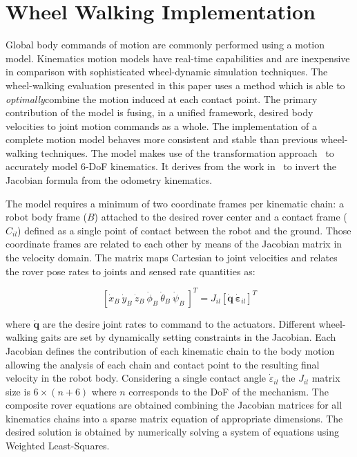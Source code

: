 \documentclass[a4paper,twocolumn]{esapub2005} %
\begin{document}
\section{Wheel Walking Implementation}

Global body commands of motion are commonly performed using a motion model.
Kinematics motion models have real-time capabilities and are inexpensive in
comparison with sophisticated wheel-dynamic simulation techniques.  The
wheel-walking evaluation presented in this paper uses a method which is able to
\textit{optimally}\footnotemark[2] combine the motion induced at each contact
point. The primary contribution of the model is fusing, in a unified framework,
desired body velocities to joint motion commands as a whole.  The
implementation of a complete motion model behaves more consistent and stable
than previous wheel-walking techniques. The model makes use of the
transformation approach~\cite{Tarokh2005} to accurately model 6-DoF kinematics.
It derives from the work in~\cite{Hidalgo-Carrio2014} to invert the Jacobian
formula from the odometry kinematics.

The model requires a minimum of two coordinate frames per kinematic chain:
a robot body frame ($B$) attached to the desired rover center and a
contact frame ($C_{il}$) defined as a single point of contact between the robot
and the ground. Those coordinate frames are related to each other by means of
the Jacobian matrix in the velocity domain. The matrix maps Cartesian to joint velocities and
relates the rover pose rates to joints and sensed rate quantities as:

\begin{equation}
    \left[\dot{x}_{B} ~ \dot{y}_{B} ~ \dot{z}_{B} ~ \dot{\phi}_{B} ~ \dot{\theta}_{B} ~ \dot{\psi}_{B} ~ \right]^T =
    J_{il} \left[\boldsymbol{\dot{q}} ~ \boldsymbol{\dot{\varepsilon}}_{il} \right]^T
\label{eq:wheeljacobian}
\end{equation}

where $\boldsymbol{\dot{q}}$ are the desire joint rates to command to the
actuators.  Different wheel-walking gaits are set by dynamically setting
constraints in the Jacobian. Each Jacobian defines the contribution of each
kinematic chain to the body motion allowing the analysis of each chain and
contact point to the resulting final velocity in the robot body.  Considering a
single contact angle $\dot{\varepsilon}_{il}$ the $J_{il}$ matrix size is $6
\times (n + 6)$ where $n$ corresponds to the DoF of the mechanism.  The
composite rover equations are obtained combining the Jacobian matrices for all
kinematics chains into a sparse matrix equation of appropriate dimensions. The
desired solution is obtained by numerically solving a system of equations using
Weighted Least-Squares.
\end{document}
